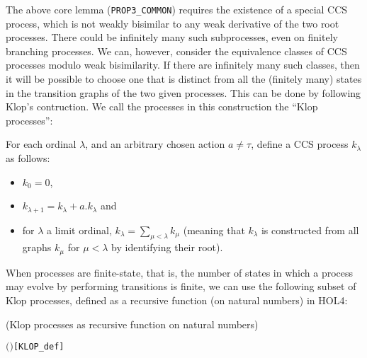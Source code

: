 The above core lemma (\texttt{PROP3_COMMON}) requires the
existence of a special CCS process, which is not weakly bisimilar to
any weak derivative of the two root processes.
There could be infinitely many such subprocesses, even on finitely
branching processes.
We can, however, consider the equivalence classes of CCS processes
modulo weak bisimilarity.
If there are infinitely many such classes, 
then it will be 
possible to choose one that is distinct from all the (finitely many) states in the
transition graphs of the two given processes.
This can be done by following Klop's contruction.
 We call the processes in this construction the ``Klop processes'':
\begin{definition}
For each ordinal $\lambda$, and an arbitrary chosen action $a \neq \tau$,
define a CCS process $k_\lambda$ as follows:
\begin{itemize}
\item $k_0 = 0$,
\item $k_{\lambda+1} = k_\lambda + a.k_\lambda$ and
\item for $\lambda$ a limit ordinal, $k_\lambda = \sum_{\mu < \lambda}
  k_\mu$ (meaning that $k_\lambda$ is constructed from all graphs
  $k_\mu$ for $\mu < \lambda$ by identifying their root).
\end{itemize}
\end{definition}
When processes are finite-state, that is,
the number of  states in which a process may evolve by performing
transitions is finite, 
we can use  the following subset of Klop processes, 
defined as a recursive function (on natural numbers) in HOL4:
\begin{definition}{(Klop processes as recursive function on natural numbers)}
\begin{alltt}
      \HOLTokenDefEquality{} 
     \ensuremath{(} \ensuremath{)} \HOLTokenDefEquality{}    \HOLSymConst{\ensuremath{+}}  \HOLSymConst{\ensuremath{\ldotp}}  \hfill{[KLOP_def]}
\end{alltt}
\end{definition}

